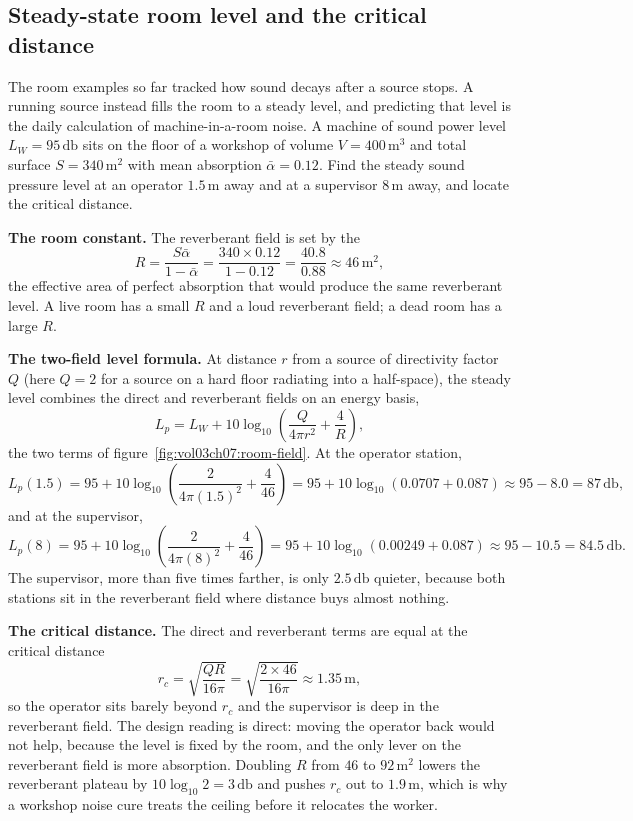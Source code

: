 \subsection{Steady-state room level and the critical distance}

The room examples so far tracked how sound decays after a source stops. A
running source instead fills the room to a steady level, and predicting that
level is the daily calculation of machine-in-a-room noise. A machine of
sound power level $L_W = 95\,\si{\decibel}$ sits on the floor of a workshop
of volume $V = 400\,\si{\meter\cubed}$ and total surface
$S = 340\,\si{\meter\squared}$ with mean absorption $\bar\alpha = 0.12$. Find
the steady sound pressure level at an operator $1.5\,\si{\meter}$ away and at
a supervisor $8\,\si{\meter}$ away, and locate the critical distance.

\textbf{The room constant.} The reverberant field is set by the
\[
R = \frac{S\bar\alpha}{1-\bar\alpha}
  = \frac{340\times 0.12}{1-0.12}
  = \frac{40.8}{0.88} \approx 46\,\si{\meter\squared},
\]
the effective area of perfect absorption that would produce the same
reverberant level. A live room has a small $R$ and a loud reverberant field;
a dead room has a large $R$.

\textbf{The two-field level formula.} At distance $r$ from a source of
directivity factor $Q$ (here $Q=2$ for a source on a hard floor radiating
into a half-space), the steady level combines the direct and reverberant
fields on an energy basis,
\[
L_p = L_W + 10\log_{10}\!\left(\frac{Q}{4\pi r^2} + \frac{4}{R}\right),
\]
the two terms of figure~\ref{fig:vol03ch07:room-field}. At the operator
station,
\[
L_p(1.5) = 95 + 10\log_{10}\!\left(\frac{2}{4\pi(1.5)^2} + \frac{4}{46}\right)
        = 95 + 10\log_{10}(0.0707 + 0.087)
        \approx 95 - 8.0 = 87\,\si{\decibel},
\]
and at the supervisor,
\[
L_p(8) = 95 + 10\log_{10}\!\left(\frac{2}{4\pi(8)^2} + \frac{4}{46}\right)
      = 95 + 10\log_{10}(0.00249 + 0.087)
      \approx 95 - 10.5 = 84.5\,\si{\decibel}.
\]
The supervisor, more than five times farther, is only $2.5\,\si{\decibel}$
quieter, because both stations sit in the reverberant field where distance
buys almost nothing.

\textbf{The critical distance.} The direct and reverberant terms are equal
at the critical distance
\[
r_c = \sqrt{\frac{Q R}{16\pi}}
    = \sqrt{\frac{2\times 46}{16\pi}}
    \approx 1.35\,\si{\meter},
\]
so the operator sits barely beyond $r_c$ and the supervisor is deep in the
reverberant field. The design reading is direct: moving the operator back
would not help, because the level is fixed by the room, and the only lever
on the reverberant field is more absorption. Doubling $R$ from $46$ to
$92\,\si{\meter\squared}$ lowers the reverberant plateau by
$10\log_{10}2 = 3\,\si{\decibel}$ and pushes $r_c$ out to
$1.9\,\si{\meter}$, which is why a workshop noise cure treats the ceiling
before it relocates the worker.

